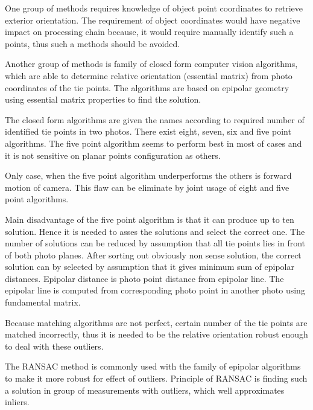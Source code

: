 \documentclass[a4paper,12pt]{article}
\begin{document}
One group of methods requires knowledge of object point coordinates to retrieve exterior
orientation. 
The requirement of object coordinates would have negative impact on processing 
chain because, it would require manually identify such a points, thus 
such a methods should be avoided. 

Another group of methods is family of closed form computer vision algorithms,
which are able to determine relative orientation (essential matrix) from photo coordinates 
of the tie points. The algorithms are based on epipolar geometry using essential matrix 
properties to find the solution. 

The closed form algorithms are given the names 
according to required number of identified tie points in two photos.
There exist eight, seven, six and five point algorithms. The five point algorithm seems to perform best in most
of cases \cite{stewenius2006recent} and it is not sensitive on planar points configuration as others.

Only case, when the five point algorithm \cite{nister2004efficient} underperforms 
\cite{bruckner2008experimental} the others is forward motion of camera.
This flaw can be eliminate by  joint usage of eight and five point algorithms.

Main disadvantage of the five point algorithm is that it can produce up to ten solution.
Hence it is needed to asses the solutions and select the correct one. The number of solutions
can be reduced by assumption that all tie points lies in front of both photo 
planes. After sorting out obviously non sense solution,
 the correct solution can by selected by assumption that it gives minimum sum of epipolar distances.
 Epipolar distance is photo point distance
 from epipolar line. The epipolar line is computed from corresponding photo point 
 in another photo using fundamental matrix.
  
Because matching algorithms are not perfect, certain number of the tie points are matched 
incorrectly, thus it is needed to be the relative orientation robust enough to
deal with these outliers.

The RANSAC \cite{wiki:RANSAC} method is commonly used with the family of epipolar algorithms to 
make it more robust for effect of outliers.
Principle of RANSAC is finding such  a solution in group of measurements with outliers, 
which well approximates inliers.  
\end{document}
